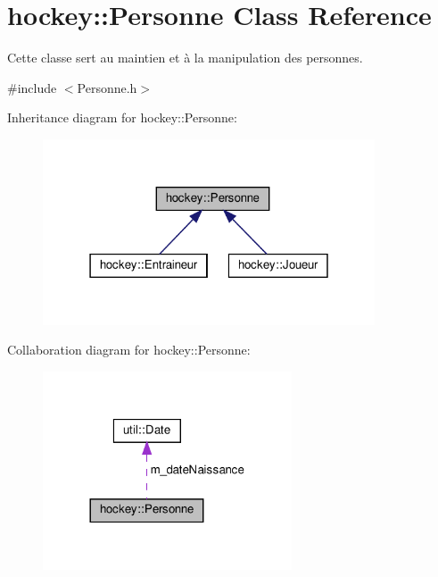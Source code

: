 \hypertarget{classhockey_1_1Personne}{}\section{hockey\+:\+:Personne Class Reference}
\label{classhockey_1_1Personne}


Cette classe sert au maintien et à la manipulation des personnes.  




{\ttfamily \#include $<$Personne.\+h$>$}



Inheritance diagram for hockey\+:\+:Personne\+:\nopagebreak
\begin{figure}[H]
\begin{center}
\leavevmode
\includegraphics[width=279pt]{classhockey_1_1Personne__inherit__graph}
\end{center}
\end{figure}


Collaboration diagram for hockey\+:\+:Personne\+:\nopagebreak
\begin{figure}[H]
\begin{center}
\leavevmode
\includegraphics[width=209pt]{classhockey_1_1Personne__coll__graph}
\end{center}
\end{figure}
